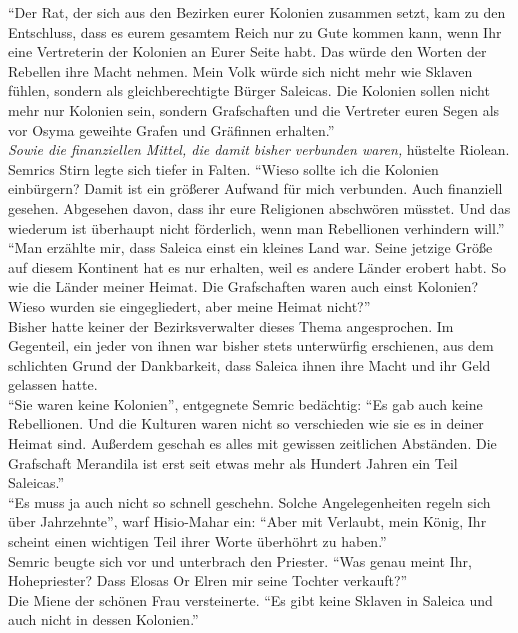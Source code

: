 ``Der Rat, der sich aus den Bezirken eurer Kolonien zusammen setzt, kam zu den Entschluss, dass es 
eurem gesamtem Reich nur zu Gute kommen kann, wenn Ihr eine Vertreterin der Kolonien an Eurer Seite 
habt. Das würde den Worten der Rebellen ihre Macht nehmen. Mein Volk würde sich nicht mehr wie 
Sklaven fühlen, sondern als gleichberechtigte Bürger Saleicas. Die Kolonien sollen nicht mehr nur 
Kolonien sein, sondern Grafschaften und die Vertreter euren Segen als vor Osyma geweihte Grafen und 
Gräfinnen erhalten.''\\
\textit{Sowie die finanziellen Mittel, die damit bisher verbunden waren,} hüstelte Riolean.\\
Semrics Stirn legte sich tiefer in Falten. ``Wieso sollte ich die Kolonien einbürgern? Damit ist 
ein größerer Aufwand für mich verbunden. Auch finanziell gesehen. Abgesehen davon, dass ihr eure 
Religionen abschwören müsstet. Und das wiederum ist überhaupt nicht förderlich, wenn man 
Rebellionen verhindern will.''\\
``Man erzählte mir, dass Saleica einst ein kleines Land war. Seine jetzige Größe auf diesem 
Kontinent hat es nur erhalten, weil es andere Länder erobert habt. So wie die Länder meiner Heimat. 
Die Grafschaften waren auch einst Kolonien? Wieso wurden sie eingegliedert, aber meine Heimat 
nicht?''\\
Bisher hatte keiner der Bezirksverwalter dieses Thema angesprochen. Im Gegenteil, ein jeder von 
ihnen war bisher stets unterwürfig erschienen, aus dem schlichten Grund der Dankbarkeit, dass 
Saleica ihnen ihre Macht und ihr Geld gelassen hatte.\\
``Sie waren keine Kolonien'', entgegnete Semric bedächtig: ``Es gab auch keine Rebellionen. Und die 
Kulturen waren nicht so verschieden wie sie es in deiner Heimat sind. Außerdem geschah es alles mit 
gewissen zeitlichen Abständen. Die Grafschaft Merandila ist erst seit etwas mehr als Hundert Jahren 
ein Teil Saleicas.''\\
``Es muss ja auch nicht so schnell geschehn. Solche Angelegenheiten regeln sich über Jahrzehnte'', 
warf Hisio-Mahar ein: ``Aber mit Verlaubt, mein König, Ihr scheint einen wichtigen Teil ihrer Worte 
überhöhrt zu haben.''\\
Semric beugte sich vor und unterbrach den Priester. ``Was genau meint Ihr, Hohepriester? Dass 
Elosas Or Elren mir seine Tochter verkauft?''\\
Die Miene der schönen Frau versteinerte. ``Es gibt keine Sklaven in Saleica und auch nicht in 
dessen Kolonien.''\\
